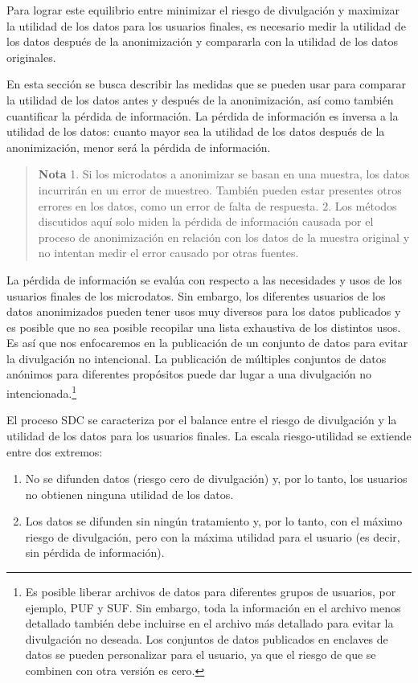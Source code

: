 \documentclass[
]{book}
\providecommand{\tightlist}{%
  \setlength{\itemsep}{0pt}\setlength{\parskip}{0pt}}
\theoremstyle{definition}
\theoremstyle{definition}
\theoremstyle{definition}
\theoremstyle{definition}
\theoremstyle{remark}
\begin{document}
Para lograr este equilibrio entre minimizar el riesgo de divulgación y maximizar la utilidad de los datos para los usuarios finales, es necesario medir la utilidad de los datos después de la anonimización y compararla con la utilidad de los datos originales.

En esta sección se busca describir las medidas que se pueden usar para comparar la utilidad de los datos antes y después de la anonimización, así como también cuantificar la pérdida de información. La pérdida de información es inversa a la utilidad de los datos: cuanto mayor sea la utilidad de los datos después de la anonimización, menor será la pérdida de información.

\begin{quote}
\textbf{Nota}
1. Si los microdatos a anonimizar se basan en una muestra, los datos incurrirán en un error de muestreo. También pueden estar presentes otros errores en los datos, como un error de falta de respuesta.
2. Los métodos discutidos aquí solo miden la pérdida de información causada por el proceso de anonimización en relación con los datos de la muestra original y no intentan medir el error causado por otras fuentes.
\end{quote}

La pérdida de información se evalúa con respecto a las necesidades y usos de los usuarios finales de los microdatos. Sin embargo, los diferentes usuarios de los datos anonimizados pueden tener usos muy diversos para los datos publicados y es posible que no sea posible recopilar una lista exhaustiva de los distintos usos. Es así que nos enfocaremos en la publicación de un conjunto de datos para evitar la divulgación no intencional. La publicación de múltiples conjuntos de datos anónimos para diferentes propósitos puede dar lugar a una divulgación no intencionada.\footnote{Es posible liberar archivos de datos para diferentes grupos de usuarios, por ejemplo, PUF y SUF. Sin embargo, toda la información en el archivo menos detallado también debe incluirse en el archivo más detallado para evitar la divulgación no deseada. Los conjuntos de datos publicados en enclaves de datos se pueden personalizar para el usuario, ya que el riesgo de que se combinen con otra versión es cero.}

El proceso SDC se caracteriza por el balance entre el riesgo de divulgación y la utilidad de los datos para los usuarios finales. La escala riesgo-utilidad se extiende entre dos extremos:

\begin{enumerate}
\def\labelenumi{\arabic{enumi}.}
\tightlist
\item
  No se difunden datos (riesgo cero de divulgación) y, por lo tanto, los usuarios no obtienen ninguna utilidad de los datos.
\item
  Los datos se difunden sin ningún tratamiento y, por lo tanto, con el máximo riesgo de divulgación, pero con la máxima utilidad para el usuario (es decir, sin pérdida de información).
\end{enumerate}
\end{document}
